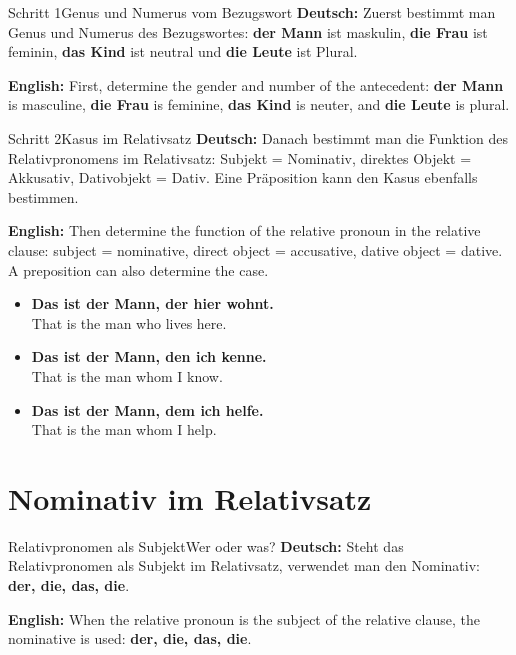 \documentclass[a4paper,11pt]{article}
\newcommand{\GermanText}[1]{\textbf{Deutsch: }#1\par}
\newcommand{\EnglishText}[1]{{\small\color{SoftGray}\textbf{English: }#1\par}}
\newcommand{\ExampleItem}[2]{\item \textbf{#1}\\{\small\color{SoftGray}#2}}
\begin{document}
        \begin{grammarentry}{Schritt 1}{Genus und Numerus vom Bezugswort}
            \GermanText{Zuerst bestimmt man Genus und Numerus des Bezugswortes: \textbf{der Mann} ist maskulin, \textbf{die Frau} ist feminin, \textbf{das Kind} ist neutral und \textbf{die Leute} ist Plural.}
            \EnglishText{First, determine the gender and number of the antecedent: \textbf{der Mann} is masculine, \textbf{die Frau} is feminine, \textbf{das Kind} is neuter, and \textbf{die Leute} is plural.}
        \end{grammarentry}

        \begin{grammarentry}{Schritt 2}{Kasus im Relativsatz}
            \GermanText{Danach bestimmt man die Funktion des Relativpronomens im Relativsatz: Subjekt = Nominativ, direktes Objekt = Akkusativ, Dativobjekt = Dativ. Eine Präposition kann den Kasus ebenfalls bestimmen.}
            \EnglishText{Then determine the function of the relative pronoun in the relative clause: subject = nominative, direct object = accusative, dative object = dative. A preposition can also determine the case.}
        \end{grammarentry}

        \begin{exbox}
            \begin{itemize}
                \ExampleItem{Das ist der Mann, der hier wohnt.}{That is the man who lives here.}
                \ExampleItem{Das ist der Mann, den ich kenne.}{That is the man whom I know.}
                \ExampleItem{Das ist der Mann, dem ich helfe.}{That is the man whom I help.}
            \end{itemize}
        \end{exbox}

    \section{Nominativ im Relativsatz}

        \begin{grammarentry}{Relativpronomen als Subjekt}{Wer oder was?}
            \GermanText{Steht das Relativpronomen als Subjekt im Relativsatz, verwendet man den Nominativ: \textbf{der, die, das, die}.}
            \EnglishText{When the relative pronoun is the subject of the relative clause, the nominative is used: \textbf{der, die, das, die}.}
        \end{grammarentry}
\end{document}

